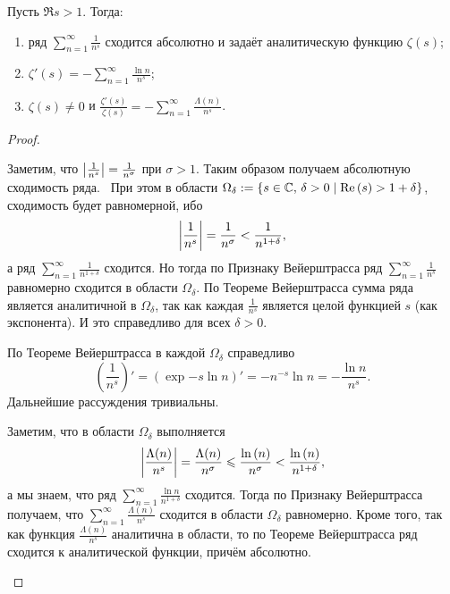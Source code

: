\begin{ntheorem}
\label{thm:I-3}
	Пусть $\Re{s} > 1$. Тогда:
	\begin{enumerate}
		\item
		\label{thm:I-3-1}
			ряд $\sum_{n=1}^\infty \frac{1}{n^s}$ сходится абсолютно и задаёт аналитическую функцию $\zeta(s)$;
		\item
		\label{thm:I-3-2}
			$\zeta'(s) = -\sum_{n=1}^\infty \frac{\ln{n}}{n^s}$;
		\item
		\label{thm:I-3-3}
		    $\zeta(s) \ne 0$ и $\frac{\zeta'(s)}{\zeta(s)} = -\sum_{n=1}^\infty \frac{\Lambda(n)}{n^s}$.
	\end{enumerate}
\end{ntheorem}
\begin{proof}
	\hfill
	\begin{statesp}
		\item
		    Заметим, что $\left| \frac{1}{n^s} \right| = \frac{1}{n^\sigma}$ при $\sigma > 1$. Таким образом получаем абсолютную сходимость ряда.~\newline
		    При этом в области $\Omega_\delta := \{ s \in \mathbb{C},\, \delta > 0 \mid \operatorname{Re}\left( s \right) > 1 + \delta \}$, сходимость будет равномерной, ибо
		    \[
		        \left| \frac{1}{n^s} \right| = \frac{1}{n^\sigma} < \frac{1}{n^{1+\delta}},
		    \]
		    а ряд $\sum_{n=1}^\infty \frac{1}{n^{1+\delta}}$ сходится. Но тогда по Признаку Вейерштрасса ряд $\sum_{n=1}^\infty \frac{1}{n^s}$ равномерно сходится в области $\Omega_\delta$. 
		    По Теореме Вейерштрасса сумма ряда является аналитичной в $\Omega_\delta$, так как каждая $\frac{1}{n^s}$ является целой функцией $s$ (как экспонента). И это справедливо для всех $\delta > 0$.
		\item 
		    По Теореме Вейерштрасса в каждой $\Omega_\delta$ справедливо
		    \[
		        \left(\frac{1}{n^s} \right)' 
		        = \left( \exp{-s\ln{n}} \right)' 
		        = -n^{-s}\ln{n} = -\frac{\ln{n}}{n^s}.
		    \]
		    Дальнейшие рассуждения тривиальны.
		\item
		    Заметим, что в области $\Omega_\delta$ выполняется
		    \[
		    	\left| \frac{\Lambda(n)}{n^s} \right| = \frac{\Lambda(n)}{n^\sigma} 
		    	\leqslant \frac{\operatorname{ln}\left( n \right)}{n^\sigma} < \frac{\operatorname{ln}\left( n \right)}{n^{1+\delta}},
		    \]
		    а мы знаем, что ряд $\sum_{n=1}^\infty \frac{\ln{n}}{n^{1+\delta}}$ сходится. Тогда по Признаку Вейерштрасса получаем, что $\sum\limits_{n=1}^\infty \frac{\Lambda(n)}{n^s}$ сходится в области $\Omega_\delta$ равномерно. Кроме того, так как функция $\frac{\Lambda(n)}{n^s}$ аналитична в области, то по Теореме Вейерштрасса ряд сходится к аналитической функции, причём абсолютно.\newline

\end{statesp}
\end{proof}
